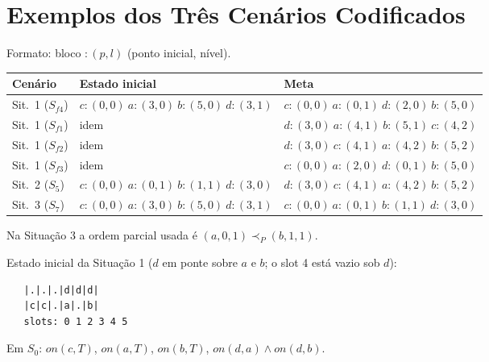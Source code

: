 \documentclass[11pt,a4paper]{article}
\newcommand{\on}{\mathit{on}}
\begin{document}
\section{Exemplos dos Tr\^es Cen\'arios Codificados}
Formato: bloco $:(p,l)$ (ponto inicial, n\'ivel).
\begin{center}
\begin{tabular}{lll}
\toprule
Cen\'ario & Estado inicial & Meta\\
\midrule
Sit.\ 1 ($S_{f4}$) & $c{:}(0,0)\ a{:}(3,0)\ b{:}(5,0)\ d{:}(3,1)$ & $c{:}(0,0)\ a{:}(0,1)\ d{:}(2,0)\ b{:}(5,0)$\\
Sit.\ 1 ($S_{f1}$) & idem & $d{:}(3,0)\ a{:}(4,1)\ b{:}(5,1)\ c{:}(4,2)$\\
Sit.\ 1 ($S_{f2}$) & idem & $d{:}(3,0)\ c{:}(4,1)\ a{:}(4,2)\ b{:}(5,2)$\\
Sit.\ 1 ($S_{f3}$) & idem & $c{:}(0,0)\ a{:}(2,0)\ d{:}(0,1)\ b{:}(5,0)$\\
Sit.\ 2 ($S_5$) & $c{:}(0,0)\ a{:}(0,1)\ b{:}(1,1)\ d{:}(3,0)$ & $d{:}(3,0)\ c{:}(4,1)\ a{:}(4,2)\ b{:}(5,2)$\\
Sit.\ 3 ($S_7$) & $c{:}(0,0)\ a{:}(3,0)\ b{:}(5,0)\ d{:}(3,1)$ & $c{:}(0,0)\ a{:}(0,1)\ b{:}(1,1)\ d{:}(3,0)$\\
\bottomrule
\end{tabular}
\end{center}
Na Situa\c{c}\~ao 3 a ordem parcial usada \'e $(a,0,1)\prec_P(b,1,1)$.

Estado inicial da Situa\c{c}\~ao 1 ($d$ em ponte sobre $a$ e $b$; o slot 4 est\'a vazio sob $d$):
\begin{lstlisting}
   |.|.|.|d|d|d|
   |c|c|.|a|.|b|
   slots: 0 1 2 3 4 5
\end{lstlisting}
Em $S_0$: $\on(c,T)$, $\on(a,T)$, $\on(b,T)$, $\on(d,a)\wedge\on(d,b)$.
\end{document}
